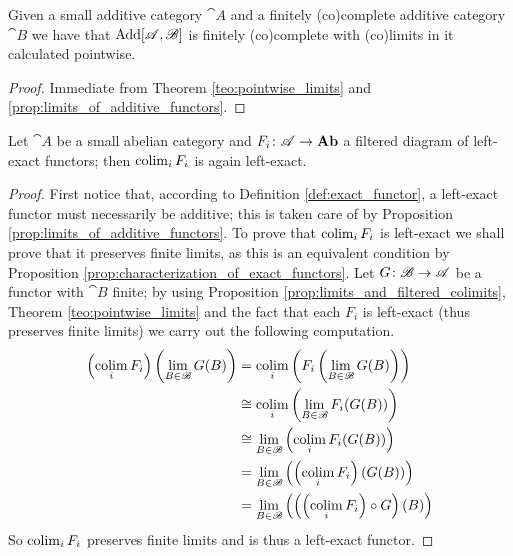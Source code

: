 \begin{corollary}
  \label{coroll:add_complete}
  Given a small additive category \(\cat{A}\) and a finitely (co)com\-plete additive category \(\cat{B}\) we have that \(\text{\normalfont Add}[{\mathscr A}, {\mathscr B}]\) is finitely (co)complete with (co)limits in it calculated pointwise.
\end{corollary}

\begin{proof}
  Immediate from Theorem \ref{teo:pointwise_limits} and \ref{prop:limits_of_additive_functors}.
\end{proof}

\begin{proposition}
  \label{prop:exactness_and_additiveness_of_filtered_diagrams}
  Let \(\cat{A}\) be a small abelian category and \(F_i\colon {\mathscr A}\to \text{\normalfont\textbf{Ab}}\) a filtered diagram of left-exact functors; then \(\operatorname*{colim}_iF_i\) is again left-exact.
\end{proposition}

\begin{proof}
  First notice that, according to Definition \ref{def:exact_functor}, a left-exact functor must necessarily be additive; this is taken care of by Proposition \ref{prop:limits_of_additive_functors}. To prove that \(\operatorname*{colim}_iF_i\) is left-exact we shall prove that it preserves finite limits, as this is an equivalent condition by Proposition \ref{prop:characterization_of_exact_functors}. Let \(G\colon {\mathscr B}\to {\mathscr A}\) be a functor with \(\cat{B}\) finite; by using Proposition \ref{prop:limits_and_filtered_colimits}, Theorem \ref{teo:pointwise_limits} and the fact that each \(F_i\) is left-exact (thus preserves finite limits) we carry out the following computation.
    \begin{align*}
      \left(\operatorname*{colim}_iF_i\right)\left(\lim_{B\in{\mathscr B}}G(B)\right) &=\operatorname*{colim}_i\left(F_i\left(\lim_{B\in{\mathscr B}}G(B)\right)\right)\\
                                                                  &\cong\operatorname*{colim}_i\left(\lim_{B\in{\mathscr B}}F_i(G(B))\right)\\
                                                                  &\cong\lim_{B\in{\mathscr B}}\left(\operatorname*{colim}_iF_i(G(B))\right)\\
                                                                  &=\lim_{B\in{\mathscr B}}\left(\left(\operatorname*{colim}_iF_i\right)(G(B))\right)\\
                                                                  &=\lim_{B\in{\mathscr B}}\left(\left(\left(\operatorname*{colim}_iF_i\right)\circ G\right)(B)\right)
    \end{align*}
    So \(\operatorname*{colim}_iF_i\) preserves finite limits and is thus a left-exact functor.
  \end{proof}

